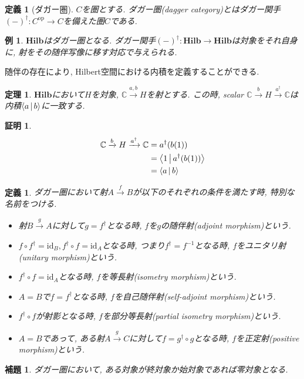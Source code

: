 \documentclass[a4paper,12pt]{ltjsarticle}
\theoremstyle{break}
\newtheorem{defn}[thm]{定義}
\newtheorem{lem}[thm]{補題}
\newtheorem{thrm}[thm]{定理}
\newtheorem{eg}[thm]{例}
\newtheorem*{prf}{証明}
\newcommand{\hilb}{\mathbf{Hilb}}
\newcommand{\mbc}{\mathbb{C}}
\newcommand{\Op}{\mathrm{op}}
\newcommand{\xr}[1]{\xrightarrow{#1}}
\newcommand{\id}{\mathrm{id}}
\newcommand{\ci}{\circ}
\newcommand{\da}{\dagger}
\numberwithin{equation}{section}
\begin{document}
\begin{defn}[ダガー圏]
  $C$を圏とする. 
  ダガー圏(dagger category)とはダガー関手$(-)^\da: C^{\Op} \to C$を備えた圏$C$である. 
\end{defn} 

\begin{eg}
  $\hilb$はダガー圏となる. 
  ダガー関手$(-)^\da: \hilb \to \hilb$は対象をそれ自身に, 射をその随伴写像に移す対応で与えられる. 
\end{eg}

随伴の存在により, Hilbert空間における内積を定義することができる. 

\begin{thrm}
  $\hilb$において$H$を対象, $\mbc \xr{a,b} H$を射とする. この時, scalar $\mbc \xr{b} H \xr{a^\da} \mbc$は内積$\Braket{a|b}$に一致する. 
\end{thrm}

\begin{prf}
  \begin{align*}
    \mbc \xr{b} H \xr{a^\da} \mbc
    &= a^\da(b(1)) \\
    &= \Braket{1|a^\da(b(1))} \\
    &= \Braket{a|b}
  \end{align*}
\end{prf}

\begin{defn}
  ダガー圏において射$A \xr{f} B$が以下のそれぞれの条件を満たす時, 特別な名前をつける.
  \begin{itemize}
    \item 射$B \xr{g} A$に対して$g=f^\da$となる時, $f$を$g$の随伴射(adjoint morphism)という. 
    \item $f \ci f^\da = \id_B, f^\da \ci f = \id_A$となる時, つまり$f^\da=f^{-1}$となる時, $f$をユニタリ射(unitary morphism)という. 
    \item $f^\da \ci f = \id_A$となる時, $f$を等長射(isometry morphism)という.
    \item $A=B$で$f=f^\da$となる時, $f$を自己随伴射(self-adjoint morphism)という. 
    \item $f^\da \circ f$が射影となる時, $f$を部分等長射(partial isometry morphism)という. 
    \item $A=B$であって, ある射$A \xr{g} C$に対して$f=g^\da \ci g$となる時, $f$を正定射(positive morphism)という. 
  \end{itemize}
\end{defn} 

\begin{lem}
  ダガー圏において, ある対象が終対象か始対象であれば零対象となる. 
\end{lem}
\end{document}
